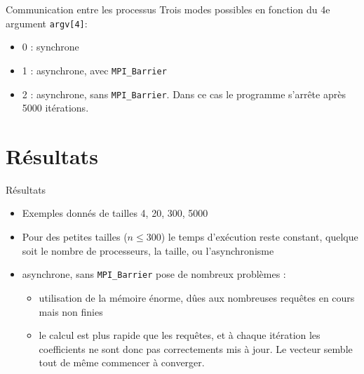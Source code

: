 \documentclass{beamer}
\begin{document}
\begin{frame}{Communication entre les processus}
Trois modes possibles en fonction du 4e argument \lstinline{argv[4]}:
\begin{itemize}
\item 0 : synchrone
\item 1 : asynchrone, avec \lstinline{MPI_Barrier}
\item 2 : asynchrone, sans \lstinline{MPI_Barrier}. Dans ce cas le programme s'arrête après 5000 itérations.
\end{itemize}
\end{frame}

\section{Résultats}

\begin{frame}{Résultats}
\begin{itemize}
\item Exemples donnés de tailles 4, 20, 300, 5000
\item Pour des petites tailles (\(n \leq 300\)) le temps d'exécution reste constant, quelque soit le nombre de processeurs, la taille, ou l'asynchronisme
\item asynchrone, sans \lstinline{MPI_Barrier} pose de nombreux problèmes :
\begin{itemize}
    \item utilisation de la mémoire énorme, dûes aux nombreuses requêtes en cours mais non finies
    \item le calcul est plus rapide que les requêtes, et à chaque itération les coefficients ne sont donc pas correctements mis à jour. Le vecteur semble tout de même commencer à converger.
\end{itemize}
\end{itemize}
\end{frame}
\end{document}
